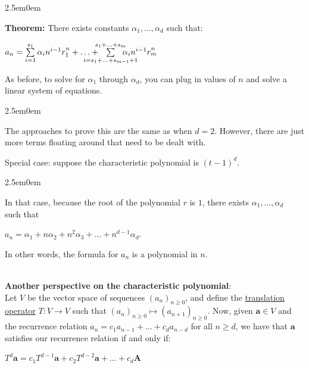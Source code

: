 \documentclass{book}
\newcommand{\hTwo}{%
\color{MidnightBlue}%
   \fontsize{13}{15}\selectfont%
}
\newcommand{\hThree}{%
   \color{PineGreen!85!Orange}
   \fontsize{12}{14}\selectfont%
}
\newenvironment{myIndent}{%
   \begin{adjustwidth}{2.5em}{0em}%
}{%
   \end{adjustwidth}%
}
\newcommand{\udefine}[1]{{%
   \setulcolor{Red}%
   \setul{0.14em}{0.07em}%
   \ul{#1}%
}}
\newcommand{\blab}[1]{\textbf{#1}}
\newcommand{\mySepTwo}[1][.]{%
   {\noindent\color{#1}{\rule{6.5in}{0.5mm}}}\\%
}
\newcommand{\retTwo}{\hfill\bigbreak}
\begin{document}
\begin{myIndent}\hTwo
   \blab{Theorem:} There exists constants $\alpha_1, \ldots, \alpha_d$ such that:

   {\center $a_n = \sum\limits_{i = 1}^{s_1} \alpha_i n^{\vphantom{|}i-1} r_1^{\vphantom{|}n} + \ldots + \hspace{-2em}\sum\limits_{i = s_1 + \ldots + s_{m-1} + 1}^{s_1 + \ldots + s_m}\hspace{-2em} \alpha_i n^{\vphantom{|}i-1}r_m^{\vphantom{|}n}$ \retTwo\par}

   As before, to solve for $\alpha_1$ through $\alpha_d$, you can plug in values of $n$ and solve a linear system of equations.\retTwo

   \begin{myIndent}\hThree
      The approaches to prove this are the same as when $d = 2$. However, there are just more terms floating around that need to be dealt with.\retTwo
   \end{myIndent}
\end{myIndent}

Special case: suppose the characteristic polynomial is $(t - 1)^d$.

\begin{myIndent}\hTwo
   In that case, because the root of the polynomial $r$ is $1$, there exists $\alpha_1, \ldots, \alpha_d$\\ such that 
   
   {\centering $a_n = \alpha_1 + n\alpha_2 + n^2\alpha_3 + \ldots + n^{d-1}\alpha_d$. \retTwo\par}
   
   In other words, the formula for $a_n$ is a polynomial in $n$.\retTwo
\end{myIndent}

\mySepTwo

\blab{Another perspective on the characteristic polynomial}:\\

Let $V$ be the vector space of sequences $(a_n)_{n\geq 0}$, and define the \udefine{translation operator} $T: V \longrightarrow V$ such that $(a_n)_{n \geq 0} \mapsto (a_{n+1})_{n\geq 0}$. Now, given $\bm{a} \in V$ and the recurrence relation $a_n = c_1a_{n-1} + \ldots + c_da_{n-d}$ for all $n \geq d$, we have that $\bm{a}$ satisfies our recurrence relation if and only if:

{\centering $T^d\bm{a} = c_1T^{d-1}\bm{a} + c_2T^{d-2}\bm{a} + \ldots + c_d\bm{A}$ \retTwo\par}
\end{document}
